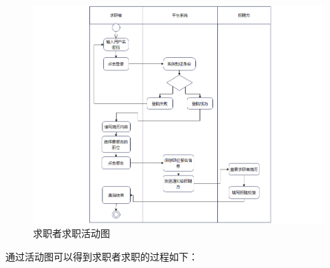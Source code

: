 \documentclass[UTF8,a4paper,10pt]{ctexart}
\begin{document}
\begin{figure}[H]
    \centering
    \includegraphics[width=\textwidth]{img/求职者求职活动图.png}
    \caption{求职者求职活动图}
    \label{fig:求职者求职活动图}
\end{figure}

通过活动图可以得到求职者求职的过程如下：
\end{document}
